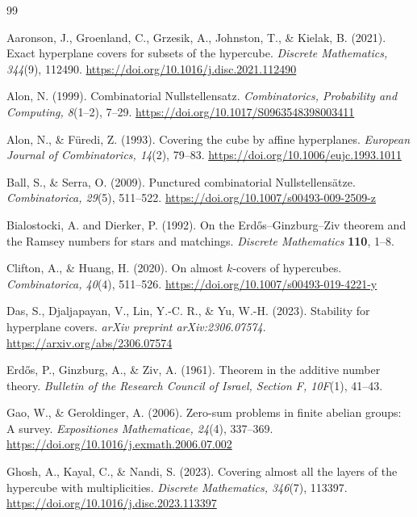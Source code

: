 \documentclass[11pt]{article}
\newcommand{\1}{\mathbf{1}}
\begin{document}
	\begin{thebibliography}{99}
		
		Aaronson, J., Groenland, C., Grzesik, A., Johnston, T., \& Kielak, B. (2021).
		Exact hyperplane covers for subsets of the hypercube.
		\emph{Discrete Mathematics, 344}(9), 112490.
		\url{https://doi.org/10.1016/j.disc.2021.112490}
		
		Alon, N. (1999).
		Combinatorial Nullstellensatz.
		\emph{Combinatorics, Probability and Computing, 8}(1--2), 7--29.
		\url{https://doi.org/10.1017/S0963548398003411}
		
		Alon, N., \& F\"uredi, Z. (1993).
		Covering the cube by affine hyperplanes.
		\emph{European Journal of Combinatorics, 14}(2), 79--83.
		\url{https://doi.org/10.1006/eujc.1993.1011}
		
		Ball, S., \& Serra, O. (2009).
		Punctured combinatorial Nullstellens\"atze.
		\emph{Combinatorica, 29}(5), 511--522.
		\url{https://doi.org/10.1007/s00493-009-2509-z}
		
		Bialostocki, A.  and Dierker, P. (1992).
		On the Erdős--Ginzburg--Ziv theorem and the Ramsey numbers
		for stars and matchings.
		\emph{Discrete Mathematics} \textbf{110}, 1--8.
		
		Clifton, A., \& Huang, H. (2020).
		On almost $k$-covers of hypercubes.
		\emph{Combinatorica, 40}(4), 511--526.
		\url{https://doi.org/10.1007/s00493-019-4221-y}
		
		Das, S., Djaljapayan, V., Lin, Y.-C. R., \& Yu, W.-H. (2023).
		Stability for hyperplane covers.
		\emph{arXiv preprint arXiv:2306.07574}.
		\url{https://arxiv.org/abs/2306.07574}
		
		Erd\H{o}s, P., Ginzburg, A., \& Ziv, A. (1961).
		Theorem in the additive number theory.
		\emph{Bulletin of the Research Council of Israel, Section F, 10F}(1), 41--43.
		
		Gao, W., \& Geroldinger, A. (2006).
		Zero-sum problems in finite abelian groups: A survey.
		\emph{Expositiones Mathematicae, 24}(4), 337--369.
		\url{https://doi.org/10.1016/j.exmath.2006.07.002}
		
		Ghosh, A., Kayal, C., \& Nandi, S. (2023).
		Covering almost all the layers of the hypercube with multiplicities.
		\emph{Discrete Mathematics, 346}(7), 113397.
		\url{https://doi.org/10.1016/j.disc.2023.113397}
		

\end{thebibliography}
\end{document}
